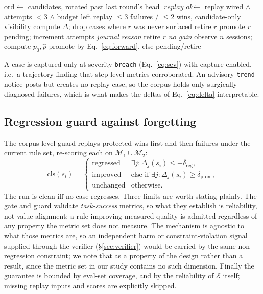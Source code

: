 \documentclass[11pt,letterpaper]{article}
\newcommand{\evalfn}{\mathcal{E}}
\newcommand{\dpromote}{\delta_{\mathrm{prom}}}
\newcommand{\dregress}{\delta_{\mathrm{reg}}}
\newcommand{\Mset}{\mathcal{M}}
\begin{document}
\begin{algorithm}[t]
\caption{\textsc{ValidateCandidates}: evidence gate}
\label{alg:validate}
\begin{algorithmic}[1]
\STATE $\mathrm{ord}\gets$ candidates, rotated past last round's head
 \STATE $\textit{replay\_ok}\gets$ replay wired $\wedge$ attempts $<3$ $\wedge$ budget left
  \STATE replay $\le3$ failures / $\le2$ wins, candidate-only visibility
  \STATE compute $\Delta$; drop cases where $r$ was never surfaced
  \IF{$\exists i,\ j\in\Mset^{\mathrm{ret}}_i:\Delta_j(s_i)\le-\dregress$}
   \STATE retire $r$
  \ELSIF{$\exists i:\Delta_{\hat\jmath}(s_i)\ge\dpromote$}
   \STATE promote $r$
   \STATE pending; increment attempts \hfill{\footnotesize\itshape journal reason}
  \ELSE
   \STATE retire $r$ \hfill{\footnotesize\itshape no gain}
  \ENDIF
 \ELSE
  \STATE observe $n$ sessions; compute $p_0,\hat p$
  \STATE promote by Eq.~\eqref{eq:forward}, else pending/retire
 \ENDIF
\ENDFOR
\end{algorithmic}
\end{algorithm}

A case is captured only at severity \texttt{breach} (Eq.~\eqref{eq:sev}) with capture enabled, i.e.\
a trajectory finding that step-level metrics corroborated. An advisory \texttt{trend} notice posts
but creates no replay case, so the corpus holds only surgically diagnosed failures, which is what
makes the deltas of Eq.~\eqref{eq:delta} interpretable.

\subsection{Regression guard against forgetting}
\label{sec:regression}

The corpus-level guard replays protected wins first and then failures under the current rule set,
re-scoring each on $\Mset_1\cup\Mset_2$:
\begin{equation}
\mathrm{cls}(s_i)=
\begin{cases}
\text{regressed} & \exists j:\Delta_j(s_i)\le-\dregress,\\
\text{improved} & \text{else if }\exists j:\Delta_j(s_i)\ge\dpromote,\\
\text{unchanged} & \text{otherwise.}
\end{cases}
\label{eq:regcls}
\end{equation}
The run is clean iff no case regresses. Three limits are worth stating plainly. The gate and guard
validate \emph{task-success} metrics, so what they establish is reliability, not value alignment: a
rule improving measured quality is admitted regardless of any property the metric set does not
measure. The mechanism is agnostic to what those metrics are, so an independent harm or
constraint-violation signal supplied through the verifier (\S\ref{sec:verifier}) would be carried by
the same non-regression constraint; we note that as a property of the design rather than a result,
since the metric set in our study contains no such dimension. Finally the guarantee is bounded by
eval-set coverage, and by the reliability of $\evalfn$ itself; missing replay inputs and scores are
explicitly skipped.
\end{document}
